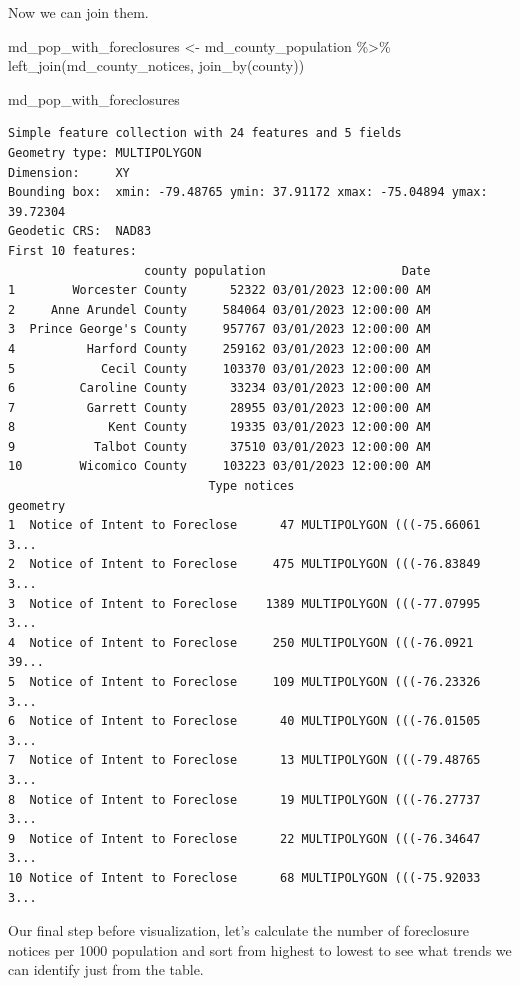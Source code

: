 \documentclass[
  letterpaper,
  DIV=11,
  numbers=noendperiod]{scrreprt}
\newenvironment{Shaded}{\begin{snugshade}}{\end{snugshade}}
\newcommand{\FunctionTok}[1]{\textcolor[rgb]{0.28,0.35,0.67}{#1}}
\newcommand{\NormalTok}[1]{\textcolor[rgb]{0.00,0.23,0.31}{#1}}
\newcommand{\OtherTok}[1]{\textcolor[rgb]{0.00,0.23,0.31}{#1}}
\newcommand{\SpecialCharTok}[1]{\textcolor[rgb]{0.37,0.37,0.37}{#1}}
\begin{document}
Now we can join them.

\begin{Shaded}
\begin{Highlighting}[]
\NormalTok{md\_pop\_with\_foreclosures }\OtherTok{\textless{}{-}}\NormalTok{ md\_county\_population }\SpecialCharTok{\%\textgreater{}\%}
  \FunctionTok{left\_join}\NormalTok{(md\_county\_notices, }\FunctionTok{join\_by}\NormalTok{(county))}

\NormalTok{md\_pop\_with\_foreclosures}
\end{Highlighting}
\end{Shaded}

\begin{verbatim}
Simple feature collection with 24 features and 5 fields
Geometry type: MULTIPOLYGON
Dimension:     XY
Bounding box:  xmin: -79.48765 ymin: 37.91172 xmax: -75.04894 ymax: 39.72304
Geodetic CRS:  NAD83
First 10 features:
                   county population                   Date
1        Worcester County      52322 03/01/2023 12:00:00 AM
2     Anne Arundel County     584064 03/01/2023 12:00:00 AM
3  Prince George's County     957767 03/01/2023 12:00:00 AM
4          Harford County     259162 03/01/2023 12:00:00 AM
5            Cecil County     103370 03/01/2023 12:00:00 AM
6         Caroline County      33234 03/01/2023 12:00:00 AM
7          Garrett County      28955 03/01/2023 12:00:00 AM
8             Kent County      19335 03/01/2023 12:00:00 AM
9           Talbot County      37510 03/01/2023 12:00:00 AM
10        Wicomico County     103223 03/01/2023 12:00:00 AM
                            Type notices                       geometry
1  Notice of Intent to Foreclose      47 MULTIPOLYGON (((-75.66061 3...
2  Notice of Intent to Foreclose     475 MULTIPOLYGON (((-76.83849 3...
3  Notice of Intent to Foreclose    1389 MULTIPOLYGON (((-77.07995 3...
4  Notice of Intent to Foreclose     250 MULTIPOLYGON (((-76.0921 39...
5  Notice of Intent to Foreclose     109 MULTIPOLYGON (((-76.23326 3...
6  Notice of Intent to Foreclose      40 MULTIPOLYGON (((-76.01505 3...
7  Notice of Intent to Foreclose      13 MULTIPOLYGON (((-79.48765 3...
8  Notice of Intent to Foreclose      19 MULTIPOLYGON (((-76.27737 3...
9  Notice of Intent to Foreclose      22 MULTIPOLYGON (((-76.34647 3...
10 Notice of Intent to Foreclose      68 MULTIPOLYGON (((-75.92033 3...
\end{verbatim}

Our final step before visualization, let's calculate the number of
foreclosure notices per 1000 population and sort from highest to lowest
to see what trends we can identify just from the table.
\end{document}
